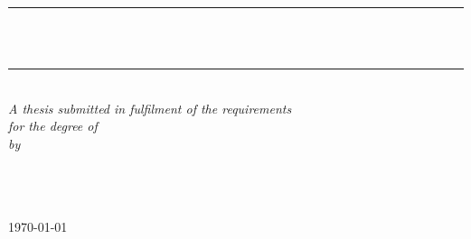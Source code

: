 \documentclass[11pt, a4paper, oneside]{Thesis} %
\title{\ttitle} %
\begin{document}
\makeatletter
\renewcommand*{\NAT@nmfmt}[1]{\textsc{#1}}
\makeatother



\frontmatter %


\fancyhead{} %
\rhead{\thepage} %
\lhead{} %

\pagestyle{fancy} %

\newcommand{\HRule}{\rule{\linewidth}{0.5mm}} %

\hypersetup{pdfsubject=\subjectname}
\hypersetup{pdfauthor=\authornames}
\hypersetup{pdfkeywords=\keywordnames}


\begin{titlepage}
\begin{center}

\HRule \\[0.4cm] %
{\huge \bfseries \ttitle}\\[0.4cm] %
\HRule \\[1.5cm] %
 
\large \textit{A thesis submitted in fulfilment of the requirements\\ for the degree of \degreename}\\[0.3cm] %
\textit{by}\\[0.4cm]
\authornames \\



\vfill
\graphicspath{ {./Figures/} }

\DEPTNAME\\ %
\textsc{ \UNIVNAME}\\[1.5cm] %
\large \today\\[2cm] %


\end{center}

\end{titlepage}
\end{document}
